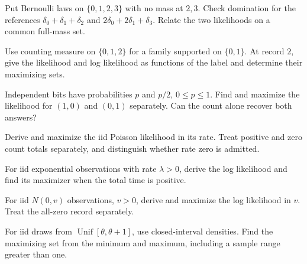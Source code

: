 \documentclass[11pt,oneside]{book}
\theoremstyle{definition}
\theoremstyle{remark}
\begin{document}
\begin{practiceexercise}
\label{wex:non-equivalent-references}
Put Bernoulli laws on $\{0,1,2,3\}$ with no mass at $2,3$. Check domination
for the references $\delta_0+\delta_1+\delta_2$ and
$2\delta_0+2\delta_1+\delta_3$. Relate the two likelihoods on a common
full-mass set.
\end{practiceexercise}

\begin{practiceexercise}
\label{wex:zero-likelihood-entire-model}
Use counting measure on $\{0,1,2\}$ for a family supported on $\{0,1\}$. At
record $2$, give the likelihood and log likelihood as functions of the label
and determine their maximizing sets.
\end{practiceexercise}

\begin{practiceexercise}
\label{wex:unequal-coin-likelihood-order}
Independent bits have probabilities $p$ and $p/2$, $0\le p\le1$. Find and
maximize the likelihood for $(1,0)$ and $(0,1)$ separately. Can the count
alone recover both answers?
\end{practiceexercise}

\begin{practiceexercise}
\label{wex:poisson-rate-likelihood}
Derive and maximize the iid Poisson likelihood in its rate. Treat positive
and zero count totals separately, and distinguish whether rate zero is
admitted.
\end{practiceexercise}

\begin{practiceexercise}
\label{wex:exponential-rate-likelihood}
For iid exponential observations with rate $\lambda>0$, derive the log
likelihood and find its maximizer when the total time is positive.
\end{practiceexercise}

\begin{practiceexercise}
\label{wex:normal-variance-likelihood}
For iid $N(0,v)$ observations, $v>0$, derive and maximize the log likelihood
in $v$. Treat the all-zero record separately.
\end{practiceexercise}

\begin{practiceexercise}
\label{wex:moving-uniform-window}
For iid draws from $\operatorname{Unif}[\theta,\theta+1]$, use
closed-interval densities. Find the maximizing set from the minimum and
maximum, including a sample range greater than one.
\end{practiceexercise}
\end{document}

